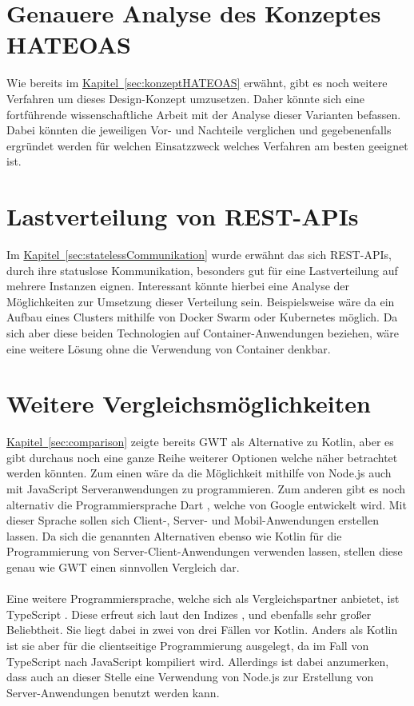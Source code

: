 \section{Genauere Analyse des Konzeptes HATEOAS}
Wie bereits im \hyperref[sec:konzeptHATEOAS]{Kapitel~\ref{sec:konzeptHATEOAS}} erwähnt, gibt es noch weitere Verfahren um dieses Design-Konzept umzusetzen. Daher könnte sich eine fortführende wissenschaftliche Arbeit mit der Analyse dieser Varianten befassen. Dabei könnten die jeweiligen Vor- und Nachteile verglichen und gegebenenfalls ergründet werden für welchen Einsatzzweck welches Verfahren am besten geeignet ist.

\section{Lastverteilung von REST-APIs}
Im \hyperref[sec:statelessCommunikation]{Kapitel~\ref{sec:statelessCommunikation}} wurde erwähnt das sich \gls{REST}-\glspl{API}, durch ihre statuslose Kommunikation, besonders gut für eine Lastverteilung auf mehrere Instanzen eignen. Interessant könnte hierbei eine Analyse der Möglichkeiten zur Umsetzung dieser Verteilung sein. Beispielsweise wäre da ein Aufbau eines Clusters mithilfe von Docker Swarm oder Kubernetes möglich. Da sich aber diese beiden Technologien auf Container-Anwendungen beziehen, wäre eine weitere Lösung ohne die Verwendung von Container denkbar.

\section{Weitere Vergleichsmöglichkeiten}
\hyperref[sec:comparison]{Kapitel~\ref{sec:comparison}} zeigte bereits \gls{GWT} als Alternative zu Kotlin, aber es gibt durchaus noch eine ganze Reihe weiterer Optionen welche näher betrachtet werden könnten. Zum einen wäre da die Möglichkeit mithilfe von Node.js \cite{nodeJs} auch mit JavaScript Serveranwendungen zu programmieren. Zum anderen gibt es noch alternativ die Programmiersprache Dart \cite{dart}, welche von Google entwickelt wird. Mit dieser Sprache sollen sich Client-, Server- und Mobil-Anwendungen erstellen lassen. Da sich die genannten Alternativen ebenso wie Kotlin für die Programmierung von Server-Client-Anwendungen verwenden lassen, stellen diese genau wie \gls{GWT} einen sinnvollen Vergleich dar.\\
\\
Eine weitere Programmiersprache, welche sich als Vergleichspartner anbietet, ist TypeScript \cite{typeScript}. Diese erfreut sich laut den Indizes \cite{tiobeIndex}, \cite{redMonkIndex} und \cite{pyplIndex} ebenfalls sehr großer Beliebtheit. Sie liegt dabei in zwei von drei Fällen vor Kotlin. Anders als Kotlin ist sie aber für die clientseitige Programmierung ausgelegt, da im Fall von TypeScript nach JavaScript kompiliert wird. Allerdings ist dabei anzumerken, dass auch an dieser Stelle eine Verwendung von Node.js zur Erstellung von Server-Anwendungen benutzt werden kann.